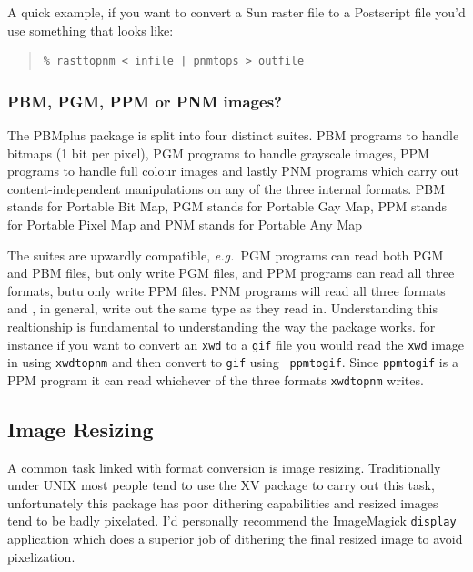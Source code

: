 \documentclass[twoside,11pt]{article}
\newcommand{\htmlref}[2]{#1}
\newcommand{\xlabel}[1]{}
\begin{document}
A quick example, if you want to convert a Sun raster file to a
Postscript file you'd use something that looks like:

\small
\begin{quote}
\begin{verbatim}
% rasttopnm < infile | pnmtops > outfile 
\end{verbatim}
\end{quote}
\normalsize

\subsubsection{PBM, PGM, PPM or PNM images?}

The PBMplus package is split into four distinct suites. PBM programs
to handle bitmaps (1 bit per pixel), PGM programs to handle grayscale
images, PPM programs to handle full colour images and lastly PNM
programs which carry out content-independent manipulations on any of
the three internal formats. PBM stands for Portable Bit Map, PGM
stands for Portable Gay Map, PPM stands for Portable Pixel Map and PNM
stands for Portable Any Map

The suites are upwardly compatible, {\em e.g.\ }PGM programs can read
both PGM and PBM files, but only write PGM files, and PPM programs can
read all three formats, butu only write PPM files. PNM programs will
read all three formats and , in general, write out the same type as
they read in. Understanding this realtionship is fundamental to
understanding the way the package works. for instance if you want to
convert an {\tt xwd} to a {\tt gif} file you would read the {\tt xwd}
image in using {\tt xwdtopnm} and then convert to {\tt gif} using {\tt
ppmtogif}. Since {\tt ppmtogif} is a PPM program it can read whichever
of the three formats {\tt xwdtopnm} writes.

\subsection{\xlabel{sc15_resizing}Image Resizing\label{sc15_resizing}}

A common task linked with format conversion is image resizing.
Traditionally under UNIX most people tend to use the
\htmlref{XV}{sc15_xv} package to carry out this task, unfortunately
this package has poor dithering capabilities and resized images tend
to be badly pixelated. I'd personally recommend the
\htmlref{ImageMagick}{sc15_magick} {\tt display} application which
does a superior job of dithering the final resized image to avoid
pixelization.
\end{document}

